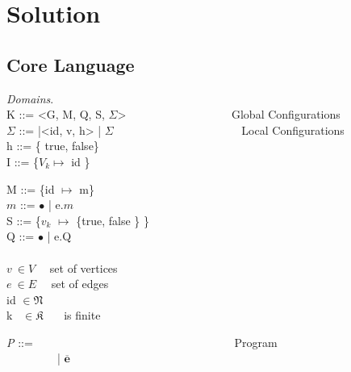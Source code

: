\section{Solution}
\subsection{Core Language}

\begin{frame}
  \textit{Domains}.\\
  K ::= <G, M, Q, S, $\Sigma$> \ \ \ \ \ \ \ \ \ \ \ \ \ \ \ \ \ \ Global Configurations \\
  $\Sigma$ ::= |<id, v, h> | $\Sigma$ \ \ \ \ \ \ \ \ \ \ \ \ \ \ \ \ \ \ \ \ \  \ Local Configurations \\
  h ::= \{ true, false\}\\
  I ::= \{$V_k \mapsto$ id \}\\
\end{frame}

\begin{frame}
  M ::= \{id $\mapsto$ m\} \\
  $m$ ::= $\bullet$ | e.$m$\\
  S ::= \{$v_k$ $\mapsto$ \{true, false \} \}\\
  Q ::= $\bullet$ | e.Q \\
  \ \\
  $v \  \in V$ \ \  set of vertices\\
  $e \ \in E$ \ \ set of edges \\
  id $\in \mathfrak{N}$ \\
  k \ $\in \mathfrak{K}$ \ \ \ is finite
  
\end{frame}

\begin{frame}
    \textit{P} ::= \ \ \ \ \ \ \ \ \ \ \ \ \ \ \ \ \ \ \ \ \ \ \ \ \ \ \ \ \ \ \ \ \ \ \ Program \\
    \ \ \ \ \ \ \ \ \ | $\overline {\textbf{e}}$ \\
\end{frame}

